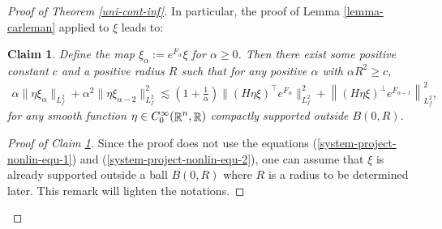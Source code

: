 \documentclass[a4paper,11pt,reqno]{amsart}
\newtheorem{claim}{Claim}
\def\R{\mathop{\rm \mathbb{R}}\nolimits}
\begin{document}
\begin{proof}[Proof of Theorem \ref{uni-cont-inf}]
 In particular, the proof of Lemma \ref{lemma-carleman} applied to $\xi$ leads to:
\begin{claim}\label{claim-lemma-carleman-non-linear}
Define the map $\xi_{\alpha}:=e^{F_{\alpha}}\xi$ for $\alpha\geq 0$. Then there exist some positive constant $c$ and a positive radius $R$ such that for any positive $\alpha$ with $\alpha R^2\geq c$,
\begin{eqnarray}
\alpha\|\eta\xi_{\alpha}\|_{L^2_f}+\alpha^2\|\eta\xi_{\alpha-2}\|^2_{L^2_f}\lesssim \left(1+\frac{1}{\alpha}\right)\|(H\eta\xi)^{\top}e^{F_{\alpha}}\|^2_{L^2_f}+\left\|(H\eta\xi)^{\perp}e^{F_{\alpha-1}}\right\|_{L^2_f}^2,\label{crucial-est-unique-est-nonlin}
\end{eqnarray}
for any smooth function $\eta\in C^{\infty}_0(\R^n,\R)$ compactly supported outside $B(0,R)$.
\end{claim}
 \begin{proof}[Proof of Claim \ref{claim-lemma-carleman-non-linear}]
 Since the proof does not use the equations (\ref{system-project-nonlin-equ-1}) and (\ref{system-project-nonlin-equ-2}), one can assume that $\xi$ is already supported outside a ball $B(0,R)$ where $R$ is a radius to be determined later. This remark will lighten the notations.
 

\end{proof}
\end{proof}
\end{document}
